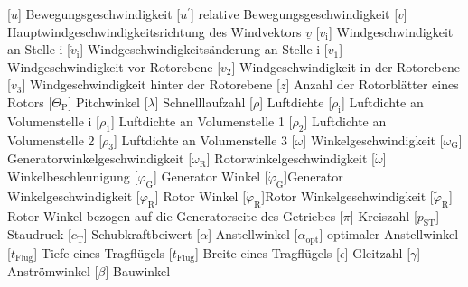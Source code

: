 \documentclass[
	pagesize,
	fontsize=12pt,
	paper=a4,
	oneside,
   reqno
]{scrartcl}
\numberwithin{equation}{section} %
\numberwithin{table}{section} %
\numberwithin{figure}{section} %
\begin{document}
\begin{acronym}[Symbols]
            [$u$]                       {Bewegungsgeschwindigkeit}
           [$u^{'}$]                   {relative Bewegungsgeschwindigkeit}
            [$v$]                       {Hauptwindgeschwindigkeitsrichtung des Windvektors $\underline v$}
           [$v_{\mathrm{i}}$]          {Windgeschwindigkeit an Stelle i}
        [$\dot{v}_{\mathrm{i}}$]    {Windgeschwindigkeitsänderung an Stelle i}
           [$v_{\mathrm{1}}$]          {Windgeschwindigkeit vor Rotorebene}
           [$v_{\mathrm{2}}$]          {Windgeschwindigkeit in der Rotorebene}
           [$v_{\mathrm{3}}$]          {Windgeschwindigkeit hinter der Rotorebene}
            [$z$]                       {Anzahl der Rotorblätter eines Rotors}
       [$\Theta_{\mathrm{P}}$]     {Pitchwinkel}
       [$\lambda$]                 {Schnelllaufzahl}
          [$\rho$]                    {Luftdichte}
         [$\rho_{\mathrm{i}}$]       {Luftdichte an Volumenstelle i}
         [$\rho_{\mathrm{1}}$]       {Luftdichte an Volumenstelle 1}
         [$\rho_{\mathrm{2}}$]       {Luftdichte an Volumenstelle 2}
         [$\rho_{\mathrm{3}}$]       {Luftdichte an Volumenstelle 3}
        [$\omega$]                  {Winkelgeschwindigkeit}
       [$\omega_{\mathrm{G}}$]     {Generatorwinkelgeschwindigkeit}
       [$\omega_{\mathrm{R}}$]     {Ro\-tor\-win\-kel\-ge\-schwin\-dig\-keit}
     [$\dot \omega$]             {Winkelbeschleunigung}
         [$\varphi_{\mathrm{G}}$]    {Generator Winkel}
      [$\dot\varphi_{\mathrm{G}}$]{Generator Winkelgeschwindigkeit}
         [$\varphi_{\mathrm{R}}$]    {Rotor Winkel}
      [$\dot\varphi_{\mathrm{R}}$]{Rotor Winkelgeschwindigkeit}
    [$\tilde{\varphi}_{\mathrm{R}}$]    {Rotor Winkel bezogen auf die Generatorseite des Getriebes}
           [$\pi$]                     {Kreiszahl}
          [$p_{\mathrm{ST}}$]         {Staudruck}
           [$c_{\mathrm{T}}$]          {Schubkraftbeiwert}
        [$\alpha$]                  {Anstellwinkel}
     [$\alpha_{\mathrm{opt}}$]   {optimaler Anstellwinkel}
        [$t_{\mathrm{Flug}}$]       {Tiefe eines Tragflügels}
        [$t_{\mathrm{Flug}}$]       {Breite eines Tragflügels}
          [$\epsilon$]                {Gleitzahl}
        [$\gamma$]                  {Anströmwinkel}
         [$\beta$]                   {Bauwinkel}
    \end{acronym}
\clearpage
\end{document}
